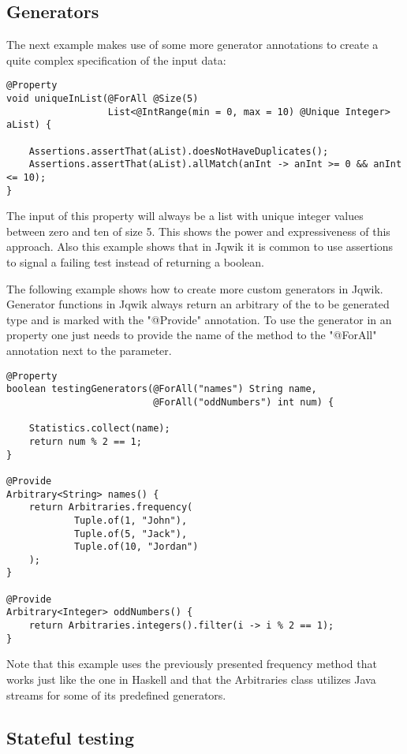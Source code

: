 \documentclass[a4paper, 12pt]{article} %
\begin{document}
\subsection{Generators}

The next example makes use of some more generator annotations to create a quite complex specification of the input data: \cite{jqwikdoc}

\begin{verbatim}
@Property
void uniqueInList(@ForAll @Size(5) 
                  List<@IntRange(min = 0, max = 10) @Unique Integer> aList) {
    
    Assertions.assertThat(aList).doesNotHaveDuplicates();
    Assertions.assertThat(aList).allMatch(anInt -> anInt >= 0 && anInt <= 10);
}
\end{verbatim}

The input of this property will always be a list with unique integer values between zero and ten of size 5. This shows the power and expressiveness of this approach. Also this example shows that in Jqwik it is common to use assertions to signal a failing test instead of returning a boolean.

The following example shows how to create more custom generators in Jqwik. Generator functions in Jqwik always return an arbitrary of the to be generated type and is marked with the "@Provide" annotation. To use the generator in an property one just needs to provide the name of the method to the "@ForAll" annotation next to the parameter. \cite{jqwikdoc}

\begin{verbatim}
@Property
boolean testingGenerators(@ForAll("names") String name, 
                          @ForAll("oddNumbers") int num) {

    Statistics.collect(name);
    return num % 2 == 1;
}

@Provide
Arbitrary<String> names() {
    return Arbitraries.frequency(
            Tuple.of(1, "John"),
            Tuple.of(5, "Jack"),
            Tuple.of(10, "Jordan")
    );
}

@Provide
Arbitrary<Integer> oddNumbers() {
    return Arbitraries.integers().filter(i -> i % 2 == 1);
}
\end{verbatim} 

Note that this example uses the previously presented frequency method that works just like the one in Haskell and that the Arbitraries class utilizes Java streams for some of its predefined generators.

\subsection{Stateful testing}
\end{document}
